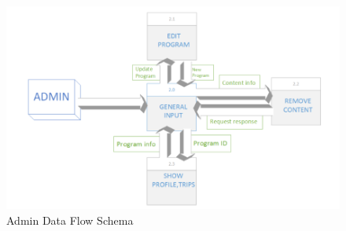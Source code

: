 \begin{figure}[!htbp]
\centering
\includegraphics[width=\textwidth]{projectChapters/images/dataflow4.png}
\caption{Admin Data Flow Schema}
\label{fig:admindataflow}
\end{figure}





